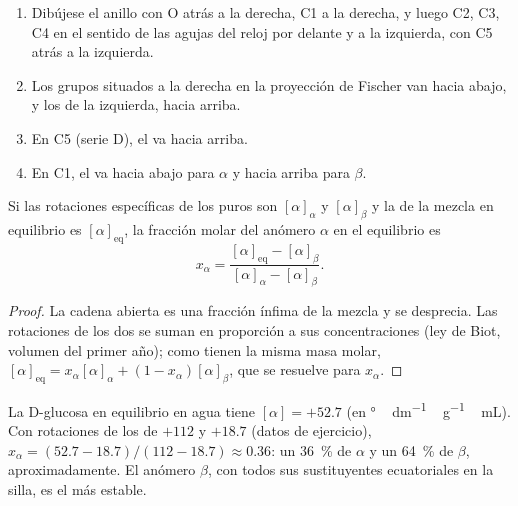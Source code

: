 \begin{method}\label{met:b2:biomolecules:haworth}
\begin{enumerate}
  \item Dibújese el anillo con O atrás a la derecha, C1 a la derecha, y luego C2, C3, C4 en el sentido de las agujas del reloj por
        delante y a la izquierda, con C5 atrás a la izquierda.
  \item Los grupos situados a la derecha en la proyección de Fischer van hacia abajo, y los de la izquierda, hacia arriba.
  \item En C5 (serie D), el  va hacia arriba.
  \item En C1, el  va hacia abajo para $\alpha$ y hacia arriba para $\beta$.
\end{enumerate}
\end{method}

\begin{proposition}\label{prop:b2:biomolecules:mutarotation}
Si las rotaciones específicas de los  puros son $[\alpha]_\alpha$ y $[\alpha]_\beta$ y la de la
mezcla en equilibrio es $[\alpha]_{\mathrm{eq}}$, la fracción molar del anómero $\alpha$ en el
equilibrio es
\begin{equation*}
x_\alpha = \frac{[\alpha]_{\mathrm{eq}} - [\alpha]_\beta}{[\alpha]_\alpha - [\alpha]_\beta}.
\end{equation*}
\end{proposition}

\begin{proof}
La cadena abierta es una fracción ínfima de la mezcla y se desprecia. Las rotaciones de los dos 
se suman en proporción a sus concentraciones (ley de Biot, volumen del primer año); como tienen la misma masa
molar, $[\alpha]_{\mathrm{eq}} = x_\alpha[\alpha]_\alpha + (1 - x_\alpha)[\alpha]_\beta$, que se resuelve
para $x_\alpha$.
\end{proof}

La D-glucosa en equilibrio en agua tiene $[\alpha] = +52.7$ (en \unit{\degree\,dm^{-1}\,g^{-1}\,mL}).
Con rotaciones de los  de $+112$ y $+18.7$ (datos de ejercicio), $x_\alpha = (52.7 - 18.7)/(112 - 18.7)
\approx 0.36$: un 36~\% de $\alpha$ y un 64~\% de $\beta$, aproximadamente. El anómero $\beta$, con todos sus
sustituyentes ecuatoriales en la silla, es el más estable.

